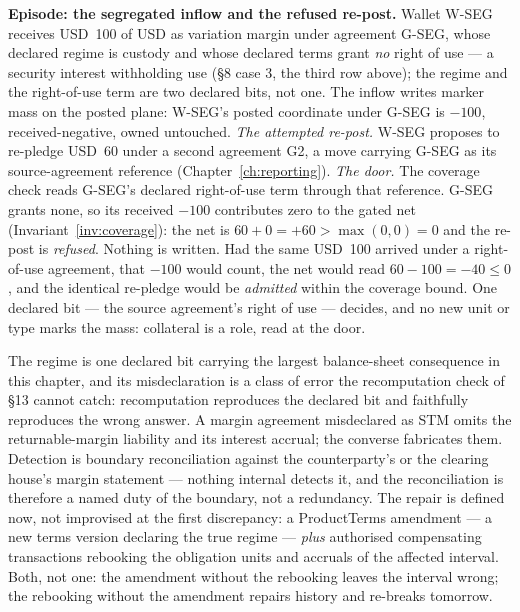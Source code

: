 \documentclass[11pt,a4paper]{article}
\newcommand{\USD}[1]{\mbox{USD~#1}}
\begin{document}
\medskip\noindent\textbf{Episode: the segregated inflow and the refused re-post.}
Wallet W-SEG receives \USD{100} of USD as variation margin under agreement G-SEG,
whose declared regime is custody and whose declared terms grant \emph{no} right of use ---
a security interest withholding use (\S8 case 3, the third row above); the regime and the
right-of-use term are two declared bits, not one. The inflow writes marker mass on the posted plane:
W-SEG's posted coordinate under G-SEG is $-100$, received-negative, owned untouched.
\emph{The attempted re-post.} W-SEG proposes to re-pledge \USD{60} under a second
agreement G2, a move carrying G-SEG as its source-agreement reference
(Chapter~\ref{ch:reporting}). \emph{The door.} The coverage check reads G-SEG's
declared right-of-use term through that reference. G-SEG grants none, so its received
$-100$ contributes zero to the gated net (Invariant~\ref{inv:coverage}): the net is
$60+0=+60>\max(0,0)=0$ and the re-post is \emph{refused}. Nothing is written. Had the
same \USD{100} arrived under a right-of-use agreement, that $-100$ would count, the net
would read $60-100=-40\le 0$, and the identical re-pledge would be \emph{admitted}
within the coverage bound. One declared bit --- the source agreement's right of use ---
decides, and no new unit or type marks the mass: collateral is a role, read at the door.

\medskip
The regime is one declared bit carrying the largest balance-sheet consequence
in this chapter, and its misdeclaration is a class of error the recomputation
check of \S13 cannot catch: recomputation reproduces the declared bit and
faithfully reproduces the wrong answer. A margin agreement misdeclared as STM
omits the returnable-margin liability and its interest accrual; the converse
fabricates them. Detection is boundary reconciliation against the
counterparty's or the clearing house's margin statement --- nothing internal
detects it, and the reconciliation is therefore a named duty of the boundary,
not a redundancy. The repair is defined now, not improvised at the first
discrepancy: a ProductTerms amendment --- a new terms version declaring the
true regime --- \emph{plus} authorised compensating transactions rebooking the obligation
units and accruals of the affected interval. Both, not one: the amendment
without the rebooking leaves the interval wrong; the rebooking without the
amendment repairs history and re-breaks tomorrow.
\end{document}
